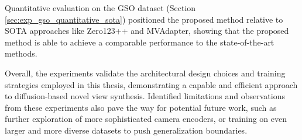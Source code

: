 Quantitative evaluation on the GSO dataset (Section \ref{sec:exp_gso_quantitative_sota}) positioned the proposed method relative to SOTA approaches like Zero123++ and MVAdapter, showing that the proposed method is able to achieve a comparable performance to the state-of-the-art methods.

Overall, the experiments validate the architectural design choices and training strategies employed in this thesis, demonstrating a capable and efficient approach to diffusion-based novel view synthesis. Identified limitations and observations from these experiments also pave the way for potential future work, such as further exploration of more sophisticated camera encoders, or training on even larger and more diverse datasets to push generalization boundaries.